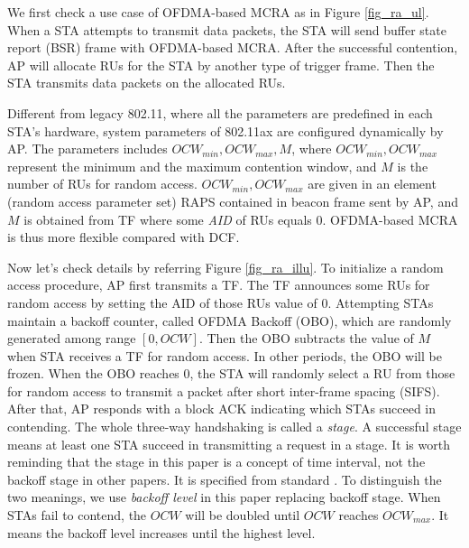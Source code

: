 \documentclass[journal]{IEEEtran}
\begin{document}
We first check a use case of OFDMA-based MCRA as in Figure \ref{fig_ra_ul}.
When a STA attempts to transmit data packets, the STA will send buffer state report (BSR) frame with OFDMA-based MCRA. 
After the successful contention, AP will allocate RUs for the STA by another type of trigger frame.
Then the STA transmits data packets on the allocated RUs.

Different from legacy 802.11, where all the parameters are predefined in each STA's hardware, system parameters of 802.11ax are configured dynamically by AP. 
The parameters includes $OCW_{min}, OCW_{max}, M$, where $OCW_{min}, OCW_{max}$ represent the minimum and the maximum contention window, and $M$ is the number of RUs for random access. 
$OCW_{min}, OCW_{max}$ are given in an element (random access parameter set) RAPS contained in beacon frame sent by AP, and $M$ is obtained from TF where some \textit{AID} of RUs equals 0.
OFDMA-based MCRA is thus more flexible compared with DCF.

Now let's check details by referring Figure \ref{fig_ra_illu}. 
To initialize a random access procedure, AP first transmits a TF. 
The TF announces some RUs for random access by setting the AID of those RUs value of 0. 
Attempting STAs maintain a backoff counter, called OFDMA Backoff (OBO), which are randomly generated among range $[0, OCW]$. 
Then the OBO subtracts the value of $M$ when STA receives a TF for random access. In other periods, the OBO will be frozen. 
When the OBO reaches 0, the STA will randomly select a RU from those for random access to transmit a packet after short inter-frame spacing (SIFS). 
After that, AP responds with a block ACK indicating which STAs succeed in contending. The whole three-way handshaking is called a \textit{stage}. 
A successful stage means at least one STA succeed in transmitting a request in a stage. 
It is worth reminding that the stage in this paper is a concept of time interval, not the backoff stage in other papers. 
It is specified from standard \cite{draft_ax}. 
To distinguish the two meanings, we use \textit{backoff level} in this paper replacing backoff stage.  
When STAs fail to contend, the $OCW$ will be doubled until $OCW$ reaches $OCW_{max}$. 
It means the backoff level increases until the highest level.
\end{document}
